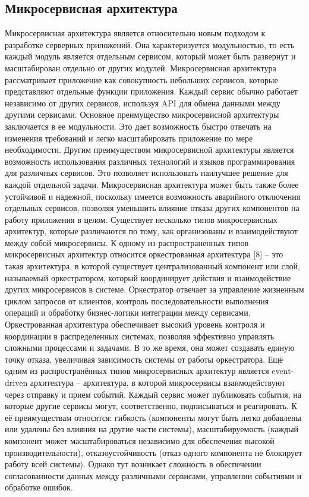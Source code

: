 \subsection{Микросервисная архитектура}

Микросервисная архитектура является относительно новым подходом к разработке серверных приложений. Она характеризуется модульностью, то есть каждый модуль является отдельным сервисом, который может быть развернут и масштабирован отдельно от других модулей. Микросервисная архитектура рассматривает приложение как совокупность небольших сервисов, которые представляют отдельные функции приложения. Каждый сервис обычно работает независимо от других сервисов, используя API для обмена данными между другими сервисами.
Основное преимущество микросервисной архитектуры заключается в ее модульности. Это дает возможность быстро отвечать на изменения требований и легко масштабировать приложение по мере необходимости. Другим преимуществом микросервисной архитектуры является возможность использования различных технологий и языков программирования для различных сервисов. Это позволяет использовать наилучшее решение для каждой отдельной задачи. Микросервисная архитектура может быть также более устойчивой и надежной, поскольку имеется возможность аварийного отключения отдельных сервисов, позволяя уменьшить влияние отказа других компонентов на работу приложения в целом.
Существует несколько типов микросервисных архитектур, которые различаются по тому, как организованы и взаимодействуют между собой микросервисы. К одному из распространенных типов микросервисных архитектур относится оркестрованная архитектура [8] – это такая архитектура, в которой существует централизованный компонент или слой, называемый оркестратором, который координирует действия и взаимодействие других микросервисов в системе. Оркестратор отвечает за управление жизненным циклом запросов от клиентов, контроль последовательности выполнения операций и обработку бизнес-логики интеграции между сервисами. Оркестрованная архитектура обеспечивает высокий уровень контроля и координации в распределенных системах, позволяя эффективно управлять сложными процессами и задачами. В то же время, она может создавать единую точку отказа, увеличивая зависимость системы от работы оркестратора.
Ещё одним из распространённых типов микросервисных архитектур является event-driven архитектура – архитектура, в которой микросервисы взаимодействуют через отправку и прием событий. Каждый сервис может публиковать события, на которые другие сервисы могут, соответственно, подписываться и реагировать. К её преимуществам относятся: гибкость (компоненты могут быть легко добавлены или удалены без влияния на другие части системы), масштабируемость (каждый компонент может масштабироваться независимо для обеспечения высокой производительности), отказоустойчивость (отказ одного компонента не блокирует работу всей системы). Однако тут возникает сложность в обеспечении согласованности данных между различными сервисами, управлении событиями и обработке ошибок. 

